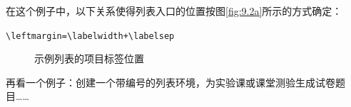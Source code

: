 在这个例子中，以下关系使得列表入口的位置按图\ref{fig:9.2a}所示的方式确定：

\begin{dmd}
\verb|\leftmargin=\labelwidth+\labelsep|
\end{dmd}


\begin{figure}[ht]
    \begin{center}
        \leavevmode {}
        \hspace{2cm}
      \caption{示例列表的项目标签位置}
      \label{fig:9.2}
    \end{center}
\end{figure}

再看一个例子：创建一个带编号的列表环境，为实验课或课堂测验生成试卷题目……


\newcommand{\etiquettequestion}[1]{%
\makebox[\labelwidth]{%
     \Pisymbol{pzd}{47}$_\thecptquestion$}}

\newenvironment{question}{\begin{list}{}{%
    \usecounter{cptquestion}%
    \setlength{\labelwidth}{2em}%
    \setlength{\labelsep}{1em} 
    \setlength{\itemindent}{15pt}%
    \setlength{\leftmargin}{.8cm} 
    \setlength{\rightmargin}{10pt} 
    \renewcommand{\makelabel}[1]{%
        \etiquettequestion{##1}}}}
{\end{list}}

